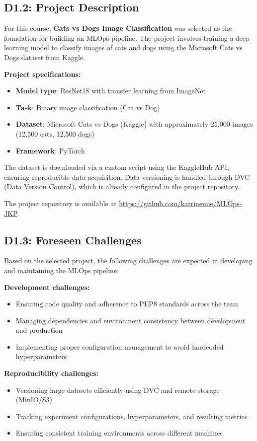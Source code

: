 \documentclass[10pt,twocolumn,letterpaper]{article}
\begin{document}
\subsection{D1.2: Project Description}
For this course, \textbf{Cats vs Dogs Image Classification} was selected as the foundation for building an MLOps pipeline. The project involves training a deep learning model to classify images of cats and dogs using the Microsoft Cats vs Dogs dataset from Kaggle.

\textbf{Project specifications:}
\begin{itemize}
    \item \textbf{Model type}: ResNet18 with transfer learning from ImageNet
    \item \textbf{Task}: Binary image classification (Cat vs Dog)
    \item \textbf{Dataset}: Microsoft Cats vs Dogs (Kaggle) with approximately 25,000 images (12,500 cats, 12,500 dogs)
    \item \textbf{Framework}: PyTorch
\end{itemize}

The dataset is downloaded via a custom script using the KaggleHub API, ensuring reproducible data acquisition. Data versioning is handled through DVC (Data Version Control), which is already configured in the project repository.

The project repository is available at \url{https://github.com/katrinemie/MLOps-JKP}.

\subsection{D1.3: Foreseen Challenges}
Based on the selected project, the following challenges are expected in developing and maintaining the MLOps pipeline:

\textbf{Development challenges:}
\begin{itemize}
    \item Ensuring code quality and adherence to PEP8 standards across the team
    \item Managing dependencies and environment consistency between development and production
    \item Implementing proper configuration management to avoid hardcoded hyperparameters
\end{itemize}

\textbf{Reproducibility challenges:}
\begin{itemize}
    \item Versioning large datasets efficiently using DVC and remote storage (MinIO/S3)
    \item Tracking experiment configurations, hyperparameters, and resulting metrics
    \item Ensuring consistent training environments across different machines
\end{itemize}
\end{document}
